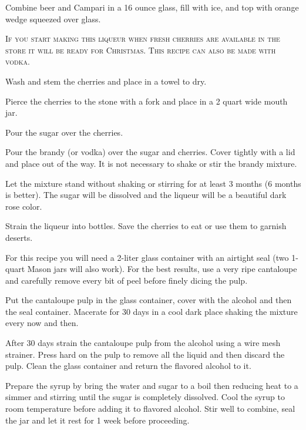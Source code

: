 \documentclass[letterpaper]{recipePMG}
\begin{document}
Combine beer and Campari in a 16 ounce glass, fill with ice, and top with orange wedge squeezed over glass.

\newpage
{}
\label{CherryLiqueur}


\textsc{If you start making this liqueur when fresh cherries are
available in the store it will be ready for Christmas.  This
recipe can also be made with vodka.}

Wash and stem the cherries and place in a towel to dry.

Pierce the cherries to the stone with a fork and place in a 2
quart wide mouth jar.

Pour the sugar over the cherries.

Pour the brandy (or vodka) over the sugar and cherries.  Cover
tightly with a lid and place out of the way.  It is not necessary
to shake or stir the brandy mixture.

Let the mixture stand without shaking or stirring for at least
3 months (6 months is better).  The sugar will be dissolved and
the liqueur will be a beautiful dark rose color.

Strain the liqueur into  bottles. Save the cherries to eat or use them
to garnish deserts.

\newpage

\label{CantaloupeLiqueur}


For this recipe you will need a 2-liter glass container with an airtight seal (two 1-quart Mason jars will also work). For the best results, use a very ripe cantaloupe and carefully remove every bit of peel before finely dicing the pulp.

Put the cantaloupe pulp in the glass container, cover with the alcohol and then the seal container. Macerate for 30 days in a cool dark place shaking the mixture every now and then.

After 30 days strain the cantaloupe pulp from the alcohol using a wire mesh strainer.  Press hard on the pulp to remove all the liquid and then discard the pulp. Clean the glass container and return the flavored alcohol to it. 

Prepare the syrup by bring the water and sugar to a boil then reducing heat to a simmer and stirring until the sugar is completely dissolved. Cool the syrup to room temperature before adding it to flavored alcohol. Stir well to combine, seal the jar and let it rest for 1 week before proceeding.
\end{document}
